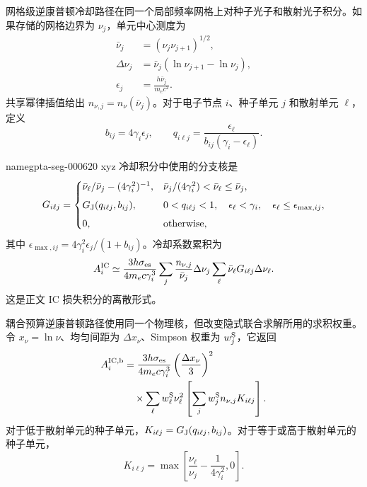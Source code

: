 \documentclass[twocolumn]{aastex702}
\makeatletter
\providecommand{\gptareaderanchor}[1]{\pdfdest name{#1} xyz}%
\providecommand{\gptareaderanchor}[1]{\special{pdf:dest (#1) [ @thispage /XYZ @xpos @ypos null ]}}%
\makeatother
\begin{document}
网格级逆康普顿冷却路径在同一个局部频率网格上对种子光子和散射光子积分。如果存储的网格边界为 \(\nu_j\)，单元中心测度为
\begin{equation}
\begin{aligned}
\bar\nu_j&=(\nu_j\nu_{j+1})^{1/2},\\
\Delta\nu_j&=\bar\nu_j\left(\ln\nu_{j+1}-\ln\nu_j\right),\\
\epsilon_j&=\frac{h\bar\nu_j}{m_e c^2}.
\end{aligned}
\end{equation}
共享幂律插值给出 \(n_{\nu,j}=n_\nu(\bar\nu_j)\)。对于电子节点 \(i\)、种子单元 \(j\) 和散射单元 \(\ell\)，定义
\[
b_{ij}=4\gamma_i\epsilon_j,\qquad
q_{i\ell j}=\frac{\epsilon_\ell}{b_{ij}(\gamma_i-\epsilon_\ell)} .
\]

\gptareaderanchor{gpta-seg-000620}%
冷却积分中使用的分支核是
\begin{equation}
G_{i\ell j}=
\begin{cases}
\bar\nu_\ell/\bar\nu_j-(4\gamma_i^2)^{-1},
& \bar\nu_j/(4\gamma_i^2)<\bar\nu_\ell\le\bar\nu_j,\\[1ex]
G_{\rm J}(q_{i\ell j},b_{ij}),
& 0<q_{i\ell j}<1,\quad \epsilon_\ell<\gamma_i,\quad
  \epsilon_\ell\le\epsilon_{\max,ij},\\[1ex]
0, & {\rm otherwise},
\end{cases}
\end{equation}
其中 \(\epsilon_{\max,ij}=4\gamma_i^2\epsilon_j/(1+b_{ij})\)。冷却系数累积为
\begin{equation}
A_i^{\rm IC}\simeq
\frac{3h\sigma_{\rm es}}{4m_e c\gamma_i^3}
\sum_j\frac{n_{\nu,j}}{\bar\nu_j}\Delta\nu_j
\sum_\ell \bar\nu_\ell G_{i\ell j}\Delta\nu_\ell .
\end{equation}
这是正文 IC 损失积分的离散形式。

耦合预算逆康普顿路径使用同一个物理核，但改变隐式联合求解所用的求积权重。令 \(x_\nu=\ln\nu\)、均匀间距为 \(\Delta x_\nu\)、Simpson 权重为 \(w_j^{\rm S}\)，它返回
\begin{equation}
\begin{aligned}
A_i^{\rm IC,b}&=
\frac{3h\sigma_{\rm es}}{4m_e c\gamma_i^3}
\left(\frac{\Delta x_\nu}{3}\right)^2\\
&\quad\times
\sum_\ell w_\ell^{\rm S}\nu_\ell^2
\left[\sum_j w_j^{\rm S}n_{\nu,j}K_{i\ell j}\right].
\end{aligned}
\end{equation}
对于低于散射单元的种子单元，\(K_{i\ell j}=G_{\rm J}(q_{i\ell j},b_{ij})\)。对于等于或高于散射单元的种子单元，
\[
K_{i\ell j}=
\max\left[\frac{\nu_\ell}{\nu_j}-\frac{1}{4\gamma_i^2},0\right].
\]
\end{document}
